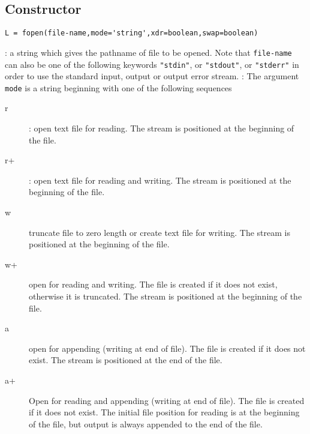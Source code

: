 
\begin{mandesc}
\end{mandesc}

\subsection*{Constructor}
\begin{verbatim}
L = fopen(file-name,mode='string',xdr=boolean,swap=boolean)
\end{verbatim}
\begin{parameters}
  \begin{varlist}
    : a string which gives the pathname of file to be opened. 
    Note that \verb+file-name+ can also be one of the following keywords \verb+"stdin"+, or 
    \verb+"stdout"+, or \verb+"stderr"+ in order to use the standard input, output or output error 
    stream.
    : The argument \verb+mode+ is a string beginning  with  one  of  the  following  sequences
    \begin{description}
      \item[r]: open text file for reading. The stream is positioned at the beginning of the
        file. 
      \item[r+]: open text file for reading and writing. The stream is positioned at the beginning of the
        file. 
      \item[w] truncate  file  to  zero  length  or create text file for writing.  The stream is
        positioned at the beginning of the file.
      \item[w+] open for reading and writing.  The file is created if it  does  not
        exist,  otherwise it is truncated.  The stream is positioned at the beginning of the file.
      \item[a] open for appending (writing at end of file).  The file is created if it does not 
	exist.  The stream is positioned at the end of the file.
      \item[a+]  Open for reading and appending (writing at end of file).  The  file
        is  created  if  it  does not exist.  The initial file position for
        reading is at the beginning of  the  file,  but  output  is  always
        appended to the end of the file.

\end{description}
\end{varlist}
\end{parameters}
